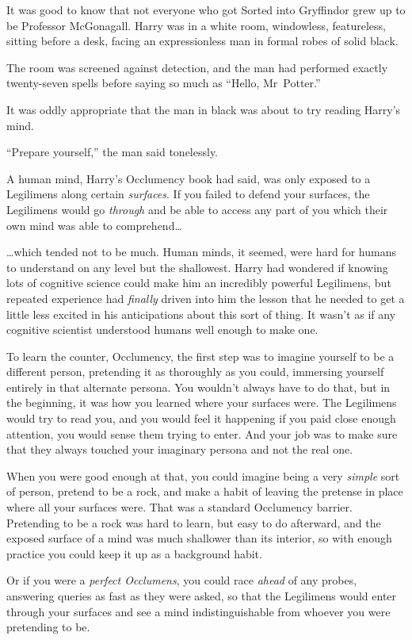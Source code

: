 It was good to know that not everyone who got Sorted into Gryffindor grew up to
be Professor McGonagall.
\later
Harry was in a white room, windowless, featureless, sitting before a desk,
facing an expressionless man in formal robes of solid black.

The room was screened against detection, and the man had performed exactly
twenty-seven spells before saying so much as “Hello, Mr~Potter.”

It was oddly appropriate that the man in black was about to try reading Harry’s
mind.

“Prepare yourself,” the man said tonelessly.

A human mind, Harry’s Occlumency book had said, was only exposed to a
Legilimens along certain \emph{surfaces}. If you failed to defend your
surfaces, the Legilimens would go \emph{through} and be able to access any part
of you which their own mind was able to comprehend…

…which tended not to be much. Human minds, it seemed, were hard for
humans to understand on any level but the shallowest. Harry had wondered if
knowing lots of cognitive science could make him an incredibly powerful
Legilimens, but repeated experience had \emph{finally} driven into him the
lesson that he needed to get a little less excited in his anticipations about
this sort of thing. It wasn’t as if any cognitive scientist understood humans
well enough to make one.

To learn the counter, Occlumency, the first step was to imagine yourself to be
a different person, pretending it as thoroughly as you could, immersing
yourself entirely in that alternate persona. You wouldn’t always have to do
that, but in the beginning, it was how you learned where your surfaces were.
The Legilimens would try to read you, and you would feel it happening if you
paid close enough attention, you would sense them trying to enter. And your job
was to make sure that they always touched your imaginary persona and not the
real one.

When you were good enough at that, you could imagine being a very \emph{simple}
sort of person, pretend to be a rock, and make a habit of leaving the pretense
in place where all your surfaces were. That was a standard Occlumency barrier.
Pretending to be a rock was hard to learn, but easy to do afterward, and the
exposed surface of a mind was much shallower than its interior, so with enough
practice you could keep it up as a background habit.

Or if you were a \emph{perfect Occlumens}, you could race \emph{ahead} of any
probes, answering queries as fast as they were asked, so that the Legilimens
would enter through your surfaces and see a mind indistinguishable from whoever
you were pretending to be.

